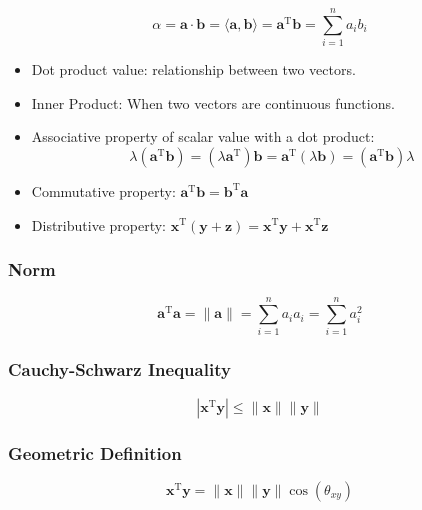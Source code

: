 \begin{equation}
    \alpha = \mathbf{a} \cdot \mathbf{b} = \langle \mathbf{a}, \mathbf{b} \rangle
    = \mathbf{a}^{\mathrm{T}} \mathbf{b} = \sum_{i=1}^{n} a_i b_{i}
\end{equation}

\begin{itemize}
    \item Dot product value: relationship between two vectors.
    \item Inner Product: When two vectors are continuous functions.
    \item Associative property of scalar value with a dot product:
    \[ \lambda (\mathbf{a}^{\mathrm{T}} \mathbf{b}) = (\lambda \mathbf{a}^{\mathrm{T}})
    \mathbf{b} = \mathbf{a}^{\mathrm{T}} (\lambda \mathbf{b}) = (\mathbf{a}^{\mathrm{T}} \mathbf{b}) \lambda \]
    \item Commutative property: $\mathbf{a}^{\mathrm{T}} \mathbf{b} = \mathbf{b}^{\mathrm{T}} \mathbf{a}$
    \item Distributive property: $\mathbf{x}^{\mathrm{T}} (\mathbf{y} + \mathbf{z}) = \mathbf{x}^{\mathrm{T}}\mathbf{y}
    + \mathbf{x}^{\mathrm{T}} \mathbf{z}$
\end{itemize}

\subsubsection{Norm}
\begin{equation}
    \mathbf{a}^{\mathrm{T}} \mathbf{a} = \|\mathbf{a}\|
    = \sum_{i=1}^{n} a_i a_i = \sum_{i=1}^{n} a_i^2
\end{equation}

\subsubsection{Cauchy-Schwarz Inequality}
\begin{equation}
    |\mathbf{x}^{\mathrm{T}} \mathbf{y}| \leq \|\mathbf{x}\| \|\mathbf{y}\|
\end{equation}

\subsubsection{Geometric Definition}

\begin{equation}
    \mathbf{x}^{\mathrm{T}} \mathbf{y} = \|\mathbf{x}\| \|\mathbf{y}\| \cos (\theta_{xy})
\end{equation}

